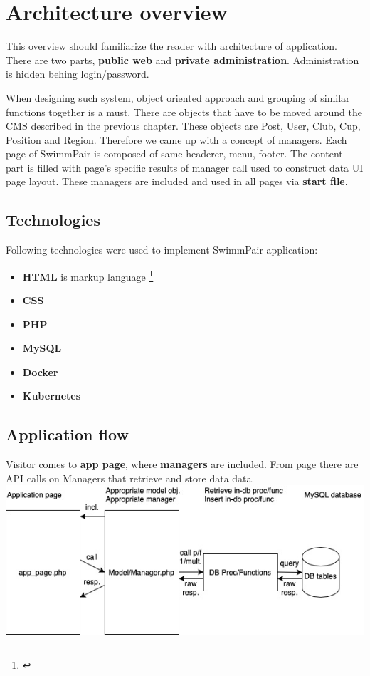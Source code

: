 \chapter{Architecture overview}
This overview should familiarize the reader with architecture of application. There are two parts, \textbf{public web} and \textbf{private administration}. Administration is hidden behing login/password. 
\par
When designing such system, object oriented approach and grouping of similar functions together is a must. There are objects that have to be moved around the CMS described in the previous chapter. These objects are Post, User, Club, Cup, Position and Region. Therefore we came up with a concept of managers. Each page of SwimmPair is composed of same headerer, menu, footer. The content part is filled with page's specific results of manager call used to construct data UI page layout. These managers are included and used in all pages via \textbf{start file}.
\section{Technologies}
Following technologies were used to implement SwimmPair application:
\begin{itemize}
    \item \textbf{HTML} is markup language \footnote{\citep{Student08}}
    \item \textbf{CSS}
    \item \textbf{PHP}
    \item \textbf{MySQL}
    \item \textbf{Docker}
    \item \textbf{Kubernetes}
\end{itemize} 
\section{Application flow}
Visitor comes to \textbf{app page}, where \textbf{managers} are included. From page there are API calls on Managers that retrieve and store data data.
\newline
\includegraphics[scale=0.707]{img/app-schema.jpg}
